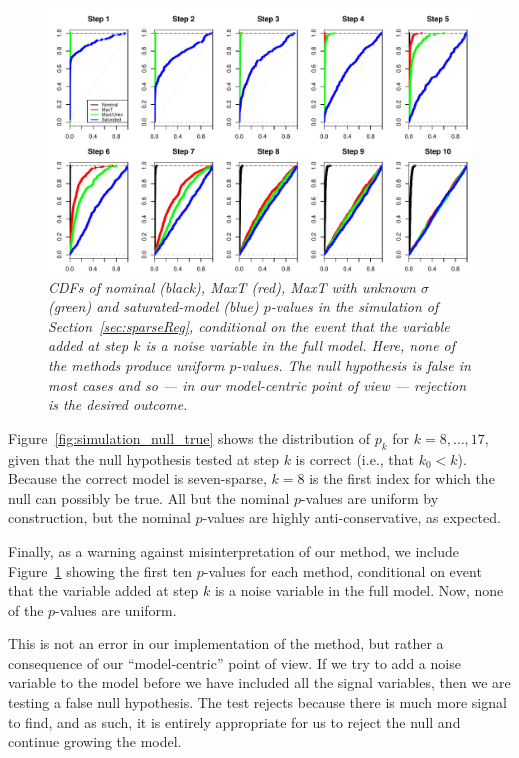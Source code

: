 \documentclass{article}
\begin{document}
\begin{figure}[h]
  \centering
  \includegraphics[width=1\textwidth]{figs/simulation_snr_5_alpha_05_noise_var.pdf}
  \caption{\em CDFs of nominal (black), MaxT (red), MaxT with unknown $\sigma$ (green) and  saturated-model (blue) $p$-values in the simulation of Section~\ref{sec:sparseReg}, conditional on the event that the variable added at step $k$ is a noise variable in the full model. Here, none of the methods produce uniform $p$-values. The null hypothesis is false in most cases and so --- in our model-centric point of view --- rejection is the desired outcome.}
  \label{fig:simulation_noise_var}
\end{figure}

Figure~\ref{fig:simulation_null_true} shows the distribution of $p_k$ for $k = 8, \ldots, 17$, given that the null hypothesis tested at step $k$ is correct (i.e., that $k_0< k$). Because the correct model is seven-sparse, $k=8$ is the first index for which the null can possibly be true. All but the nominal $p$-values are uniform by construction, but the nominal $p$-values are highly anti-conservative, as expected.

Finally, as a warning against misinterpretation of our method, we include Figure~\ref{fig:simulation_noise_var} showing the first ten $p$-values for each method, conditional on event that the variable added at step $k$ is a noise variable in the full model. Now, none of the $p$-values are uniform. 

This is not an error in our implementation of the method, but rather a consequence of our ``model-centric'' point of view. If we try to add a noise variable to the model before we have included all the signal variables, then we are testing a false null hypothesis. The test rejects because there is much more signal to find, and as such, it is entirely appropriate for us to reject the null and continue growing the model.
\end{document}
